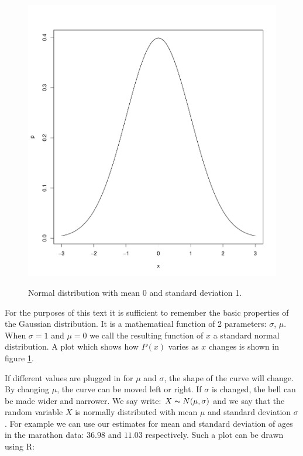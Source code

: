 \documentclass{tufte-book} %
\begin{document}
\begin{figure}
	\centering
	\includegraphics{graphics/plot-normal}
	\label{img:plot-normal}
	\caption{Normal distribution with mean 0 and standard deviation 1.}
\end{figure}

For the purposes of this text it is sufficient to remember the basic properties of the Gaussian distribution. It is a mathematical function of 2 parameters: $\sigma$, $\mu$. When $\sigma = 1$ and $\mu = 0$ we call the resulting function of $x$ a standard normal distribution. A plot which shows how $P(x)$ varies as $x$ changes is shown in figure \ref{img:plot-normal}. 

If different values are plugged in for $\mu$ and $\sigma$, the shape of the curve will change. By changing $\mu$, the curve can be moved left or right. If $\sigma$ is changed, the bell can be made wider and narrower. We say write: $X \thicksim N(\mu, \sigma)$ and we say that the random variable $X$ is normally distributed with mean $\mu$ and standard deviation $\sigma$. For example we can use our estimates for mean and standard deviation of ages in the marathon data: $36.98$ and $11.03$ respectively. Such a plot can be drawn using R:
\end{document}

